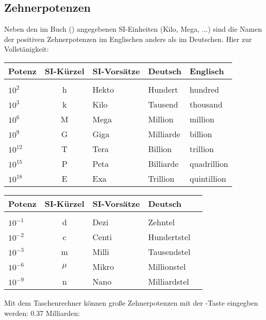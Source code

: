 \subsection{Zehnerpotenzen}


Neben den im Buch () angegebenen SI-Einheiten (Kilo, Mega, ...) sind die
Namen der positiven Zehnerpotenzen im Englischen anders als im
Deutschen. Hier zur Vollstänigkeit:

\begin{tabular}{lclll}
Potenz    & SI-Kürzel & SI-Vorsätze & Deutsch & Englisch\\
\hline\\
$10^{2}$   & h         & Hekto       & Hundert   & hundred\\
$10^{3}$   & k         & Kilo        & Tausend   & thousand\\
$10^{6}$   & M         & Mega        & Million   & million\\
$10^{9}$   & G         & Giga        & Milliarde & billion\\
$10^{12}$  & T         & Tera        & Billion   & trillion\\
$10^{15}$  & P         & Peta        & Billiarde & quadrillion\\
$10^{18}$  & E         & Exa         & Trillion  & quintillion\\
\end{tabular}

\begin{tabular}{lclll}
Potenz   & SI-Kürzel & SI-Vorsätze & Deutsch\\
\hline\\
$10^{-1}$  & d         & Dezi        & Zehntel\\
$10^{-2}$  & c         & Centi       & Hundertstel\\
$10^{-3}$  & m         & Milli       & Tausendstel\\
$10^{-6}$  & $\mu$     & Mikro       & Millionstel\\
$10^{-9}$  & n         & Nano        & Milliardstel\\
\end{tabular}

Mit dem Taschenrechner können große Zehnerpotenzen mit der
  -Taste eingegben
  werden: 0.37 Milliarden:

